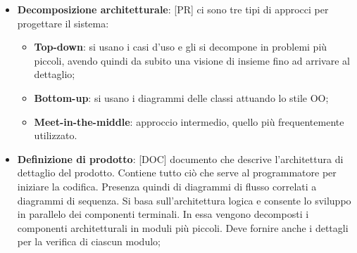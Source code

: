 \begin{itemize}

	\item \textbf{Decomposizione architetturale}: [PR] ci sono tre tipi di approcci per progettare il sistema:
		\begin{itemize}
			\item \textbf{Top-down}: si usano i casi d'uso e gli si decompone in problemi più piccoli, avendo quindi da subito una visione di insieme fino ad arrivare al dettaglio;
			\item \textbf{Bottom-up}: si usano i diagrammi delle classi attuando lo stile OO;
			\item \textbf{Meet-in-the-middle}: approccio intermedio, quello più frequentemente utilizzato.
		\end{itemize}


	\item \textbf{Definizione di prodotto}: [DOC] documento che descrive l'architettura di dettaglio del prodotto. Contiene tutto ciò che serve al programmatore per iniziare la codifica. Presenza quindi di diagrammi di flusso correlati a diagrammi di sequenza. Si basa sull'architettura logica e consente lo sviluppo in parallelo dei componenti terminali. \newline
	In essa vengono decomposti i componenti architetturali in moduli più piccoli. Deve fornire anche i dettagli per la verifica di ciascun modulo;


\end{itemize}
